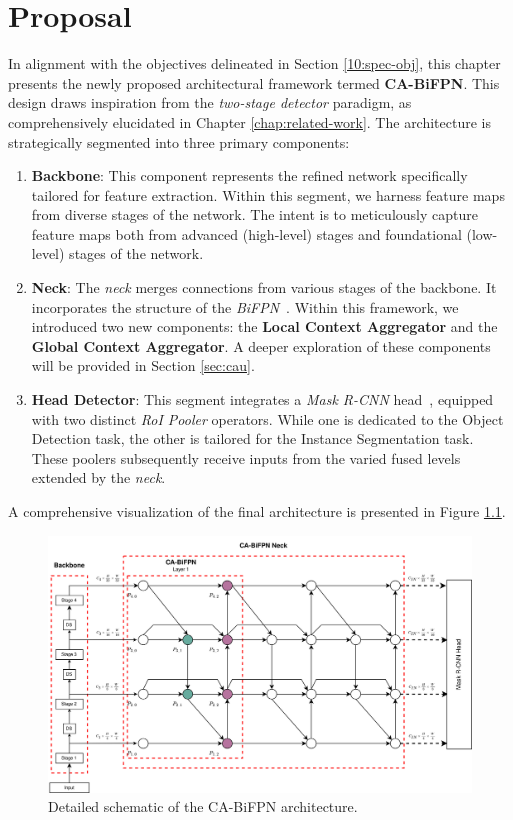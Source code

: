 \chapter{Proposal}\label{chap:40}
In alignment with the objectives delineated in Section \ref{10:spec-obj}, this chapter presents the newly proposed architectural framework termed \textbf{CA-BiFPN}. This design draws inspiration from the \textit{two-stage detector} paradigm, as comprehensively elucidated in Chapter \ref{chap:related-work}. The architecture is strategically segmented into three primary components:
\begin{enumerate}
    \item \textbf{Backbone}: This component represents the refined network specifically tailored for feature extraction. Within this segment, we harness feature maps from diverse stages of the network. The intent is to meticulously capture feature maps both from advanced (high-level) stages and foundational (low-level) stages of the network.
    \item \textbf{Neck}: The \textit{neck} merges connections from various stages of the backbone. It incorporates the structure of the \textit{BiFPN}~\cite{DBLP:journals/corr/abs-1911-09070}. Within this framework, we introduced two new components: the \textbf{Local Context Aggregator} and the \textbf{Global Context Aggregator}. A deeper exploration of these components will be provided in Section \ref{sec:cau}.
    \item \textbf{Head Detector}: This segment integrates a \textit{Mask R-CNN} head~\cite{DBLP:journals/corr/HeGDG17}, equipped with two distinct \textit{RoI Pooler} operators. While one is dedicated to the Object Detection task, the other is tailored for the Instance Segmentation task. These poolers subsequently receive inputs from the varied fused levels extended by the \textit{neck}.
\end{enumerate}
A comprehensive visualization of the final architecture is presented in Figure \ref{fig:40:arq-ca-bifpn}.\\
\begin{figure}[htb]
    \centering
    \includegraphics[width=1\linewidth]{figures/chapters-imgs/40/arq-ca-bifpn.jpg}
    \caption[Detailed schematic of the CA-BiFPN architecture]{Detailed schematic of the CA-BiFPN architecture.}
    \label{fig:40:arq-ca-bifpn}
\end{figure}

